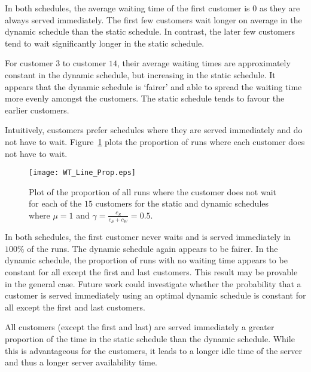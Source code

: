 In both schedules, the average waiting time of the first customer is $0$ as they are always served immediately. The first few customers wait longer on average in the dynamic schedule than the static schedule. In contrast, the later few customers tend to wait significantly longer in the static schedule.

For customer $3$ to customer $14$, their average waiting times are approximately constant in the dynamic schedule, but increasing in the static schedule. It appears that the dynamic schedule is `fairer' and able to spread the waiting time more evenly amongst the customers. The static schedule tends to favour the earlier customers.

Intuitively, customers prefer schedules where they are served immediately and do not have to wait. Figure~\ref{fig:No_Wait_Position} plots the proportion of runs where each customer does not have to wait.
\begin{figure}[htb]
	\centering
	\texttt{[image: WT\_Line\_Prop.eps]}
	\caption{Plot of the proportion of all runs where the customer does not wait for each of the $15$ customers for the static and dynamic schedules where $\mu = 1$ and $\gamma = \frac{c_{S}}{c_{S} + c_{W}} = 0.5$.}
	\label{fig:No_Wait_Position}
\end{figure}

In both schedules, the first customer never waits and is served immediately in $100 \%$ of the runs. The dynamic schedule again appears to be fairer. In the dynamic schedule, the proportion of runs with no waiting time appears to be constant for all except the first and last customers. This result may be provable in the general case. Future work could investigate whether the probability that a customer is served immediately using an optimal dynamic schedule is constant for all except the first and last customers.

All customers (except the first and last) are served immediately a greater proportion of the time in the static schedule than the dynamic schedule. While this is advantageous for the customers, it leads to a longer idle time of the server and thus a longer server availability time.

